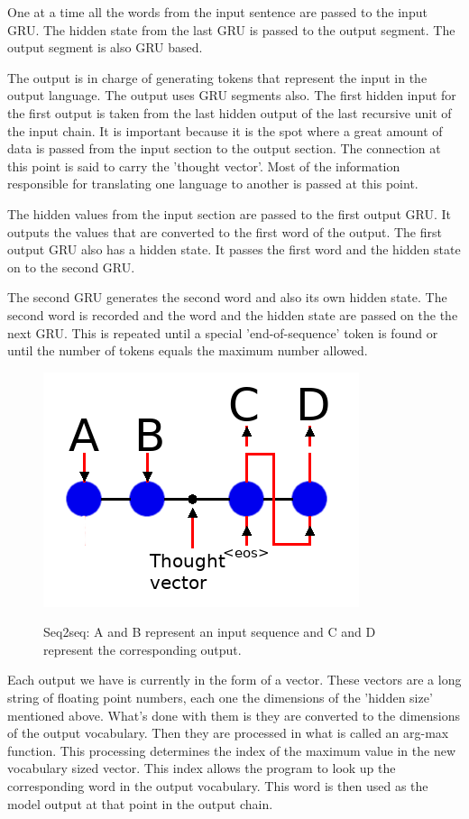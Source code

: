One at a time all the words from the input sentence are passed to the input GRU. The hidden state
from the last GRU is passed to the output segment. The output segment is also GRU based.

The output is in charge of generating tokens that represent the input in the output language. The output uses GRU segments also. The first hidden input for the first output is taken from the 
last hidden output of the last recursive unit of the input chain. It is important because it is the spot where a great amount of data is passed from the input section to the output section. 
The connection at this point is said to carry the 'thought vector'. Most of the information responsible for translating one language to another is passed at this point.

The hidden values from the input section are passed to the first output GRU. It outputs the values that are converted to the first word of the output. The first output GRU also has a hidden state. It passes the first word and the hidden state on to the second GRU.

The second GRU generates the second word and also its own hidden state. The second word is recorded and the word and the hidden state are passed on the the next GRU. This is repeated until a special 'end-of-sequence' token is found or until the number of tokens equals the maximum number allowed.

\begin{figure}[H]
	
	\includegraphics[scale=0.5]{diagram-nmt}
	
	Seq2seq: A and B represent an input sequence and C and D represent
	the corresponding output.
	
\end{figure}

Each output we have is currently in the form of a vector. These vectors are a long string of floating point numbers, each one the dimensions of the 'hidden size' mentioned above. What's done with them is they are converted to the dimensions of the output vocabulary. Then they are processed in what is called an arg-max function. This processing determines the index of the maximum value in the new vocabulary sized vector. This index allows the program to look up the corresponding word in the output vocabulary. This word is then used as the model output at that point in the output chain.

